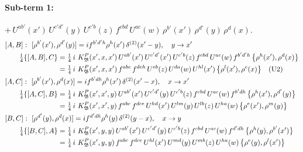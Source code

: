 \documentclass[10pt]{article}
\numberwithin{equation}{section}
\begin{document}
\paragraph{Sub-term 1:} $+\,U^{ab'}(x')\,U^{c'd'}(y)\,U^{c'b}(z)\,f^{cbd}\,U^{ac}(w)\,\rho^{b'}(x')\,\rho^{d'}(y)\,\rho^{d}(x)$.
\begin{align}
&[A,B]:\ [\rho^{b'}(x'),\rho^{d'}(y)]=i f^{b'd'h}\rho^{h}(x')\,\delta^{(2)}(x'-y),\quad y\to x'\notag\\
&\qquad \tfrac14\{[A,B],C\}=\tfrac14\,i\,\,K^{P}_{\mathfrak B}(x',x,x')\,U^{ab'}(x')\,U^{c'd'}(x')\,U^{c'b}(z)\,f^{cbd}\,U^{ac}(w)\,f^{b'd'h}\,\big\{\rho^{h}(x'),\rho^{d}(x)\big\}\notag\\
&\qquad\phantom{\tfrac14\{[A,B],C\}}=\tfrac14\,i\,\,K^{P}_{\mathfrak B}(x',x,x')\,f^{abc}\,f^{deh}\,U^{eb}(z)\,U^{da}(w)\,U^{hl}(x')\,\big\{\rho^{l}(x'),\rho^{c}(x)\big\}\quad\text{(U2)}
\label{eq:GIII.I.P-1-AB}\\
&[A,C]:\ [\rho^{b'}(x'),\rho^{d}(x)]=i f^{b'dh}\rho^{h}(x')\,\delta^{(2)}(x'-x),\quad x\to x'\notag\\
&\qquad \tfrac14\{[A,C],B\}=\tfrac14\,i\,\,K^{P}_{\mathfrak B}(x',x',y)\,U^{ab'}(x')\,U^{c'd'}(y)\,U^{c'b}(z)\,f^{cbd}\,U^{ac}(w)\,f^{b'dh}\,\big\{\rho^{h}(x'),\rho^{d'}(y)\big\}\notag\\
&\qquad\phantom{\tfrac14\{[A,C],B\}}=\tfrac14\,i\,\,K^{P}_{\mathfrak B}(x',x',y)\,f^{abc}\,f^{dce}\,U^{hd}(x')\,U^{lm}(y)\,U^{lb}(z)\,U^{ha}(w)\,\big\{\rho^{e}(x'),\rho^{m}(y)\big\}
\label{eq:GIII.I.P-1-AC}\\
&[B,C]:\ [\rho^{d'}(y),\rho^{d}(x)]=i f^{d'dh}\rho^{h}(y)\,\delta^{(2)}(y-x),\quad x\to y\notag\\
&\qquad \tfrac14\{[B,C],A\}=\tfrac14\,i\,\,K^{P}_{\mathfrak B}(x',y,y)\,U^{ab'}(x')\,U^{c'd'}(y)\,U^{c'b}(z)\,f^{cbd}\,U^{ac}(w)\,f^{d'dh}\,\big\{\rho^{h}(y),\rho^{b'}(x')\big\}\notag\\
&\qquad\phantom{\tfrac14\{[B,C],A\}}=\tfrac14\,i\,\,K^{P}_{\mathfrak B}(x',y,y)\,f^{abc}\,f^{dce}\,U^{hl}(x')\,U^{md}(y)\,U^{mb}(z)\,U^{ha}(w)\,\big\{\rho^{e}(y),\rho^{l}(x')\big\}
\label{eq:GIII.I.P-1-BC}
\end{align}
\end{document}
